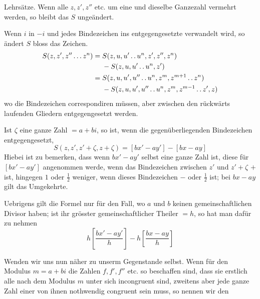 Lehrsätze. Wenn alle $z,z',z''$ etc. um eine und dieselbe Ganzezahl vermehrt werden, so bleibt das $S$ ungeändert.

Wenn $i$ in $-i$ und jedes Bindezeichen ins entgegengesetzte verwandelt wird, so ändert $S$ bloss das Zeichen.
\[
\begin{aligned}
S(z,z',z''\ldots z^n)={}&S(z,u,u'\mathinner{.\,.} u^n,z',z'',z^n)\\
&-S(z,u,u'\mathinner{.\,.} u^n,z')\\
={}&S(z,u,u',u''\mathinner{.\,.} u^n,z^m,z^{m+1}\mathinner{.\,.} z^n)\\
&-S(z,u,u',u''\mathinner{.\,.} u^n,z^m,z^{m-1}\mathinner{.\,.} z',z)
\end{aligned}
\]
wo die Bindezeichen correspondiren müssen, aber zwischen den rückwärts laufenden Gliedern entgegengesetzt werden.

Ist $\zeta$ eine ganze Zahl $=a+bi$, so ist, wenn die gegenüberliegenden Bindezeichen entgegengesetzt,
\[
S(z,z',z'+\zeta,z+\zeta)=[bx'-ay']-[bx-ay]
\]
Hiebei ist zu bemerken, dass wenn $bx'-ay'$ selbst eine ganze Zahl ist, diese für $[bx'-ay']$ angenommen werde, wenn das Bindezeichen zwischen $z'$ und $z'+\zeta$ $+$ ist, hingegen $1$ oder $\frac12$ weniger, wenn dieses Bindezeichen $-$ oder $\frac12$ ist; bei $bx-ay$ gilt das Umgekehrte.

Uebrigens gilt die Formel nur für den Fall, wo $a$ und $b$ keinen gemeinschaftlichen Divisor haben; ist ihr grösster gemeinschaftlicher Theiler $=h$, so hat man dafür zu nehmen
\[
h\left[\frac{bx'-ay'}h\right]-h\left[\frac{bx-ay}h\right]
\]

Wenden wir uns nun näher zu unserm Gegenstande selbst. Wenn für den Modulus $m=a+bi$ die Zahlen $f,f',f''$ etc. so beschaffen sind, dass sie erstlich alle nach dem Modulus $m$ unter sich incongruent sind, zweitens aber jede ganze Zahl einer von ihnen nothwendig congruent sein muss, so nennen wir den
